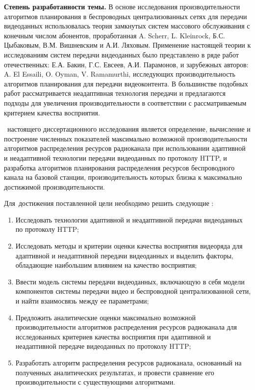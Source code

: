 \textbf{Степень разработанности темы.} В основе исследования производительности алгоритмов планирования в беспроводных централизованных сетях для передачи видеоданных использовалась теория замкнутых систем массового обслуживания с конечным числом абонентов, проработанная A. Scherr, L. Kleinrock, Б.С. Цыбаковым, В.М. Вишневским и А.И. Ляховым. Применение настоящей теории к исследованиям систем передачи видеоданных было представлено в ряде работ отечественных: Е.А. Бакин, Г.С. Евсеев, А.И. Парамонов, и зарубежных авторов: A. El Essaili, O. Oyman, V. Ramamurthi, исследующих производительность алгоритмов планирования для передачи видеоконтента. В большинстве подобных работ рассматривается неадаптивная технология передачи и предлагаются подходы для увеличения производительности в соответствии с рассматриваемым критерием качества восприятия.

\aim\ настоящего диссертационного исследования является определение, вычисление и построение численных показателей максимально возможной производительности алгоритмов распределения ресурсов радиоканала при использовании адаптивной и неадаптивной технологии передачи видеоданных по протоколу HTTP, и разработка алгоритмов планирования распределения ресурсов беспроводного канала на базовой станции, производительность которых близка к максимально достижимой производительности.

Для~достижения поставленной цели необходимо решить следующие {\tasks}:
\begin{enumerate}
    \item Исследовать технологии адаптивной и неадаптивной передачи видеоданных по протоколу HTTP;
    \item Исследовать методы и критерии оценки качества восприятия видеоряда для адаптивной и неадаптивной передачи видеоданных и выделить факторы, обладающие наибольшим влиянием на качество восприятия;
    \item Ввести модель системы передачи видеоданных, включающую в себя модели компонентов системы передачи видео и беспроводной централизованной сети, и найти взаимосвязь между ее параметрами;
    \item Предложить аналитические оценки максимально возможной производительности алгоритмов распределения ресурсов радиоканала для исследованных критериев качества восприятия при адаптивной и неадаптивной передаче видеоданных по протоколу HTTP;
    \item Разработать алгоритм распределения ресурсов радиоканала, основанный на полученных аналитических результатах, и провести сравнение его производительности с существующими алгоритмами.
\end{enumerate}

